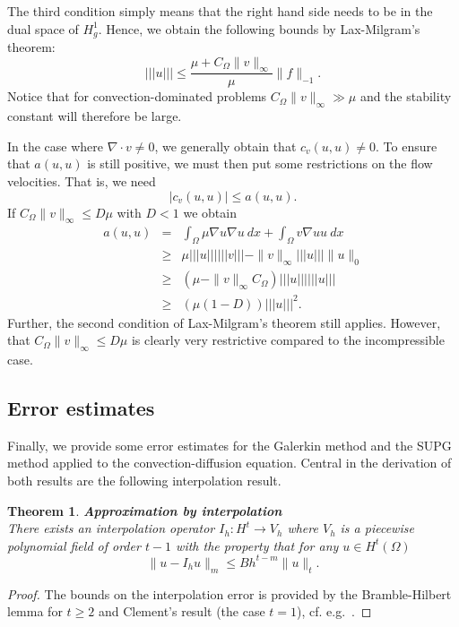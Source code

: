 \documentclass[a4paper,11pt]{amsart}
\newcommand{\norm}[1]{ |\!|\!| #1 |\!|\!|}
\newtheorem{theorem}{Theorem}[section]
\begin{document}
The third condition simply means that the right hand side needs to be in the dual 
space of $H^1_g$. Hence, we obtain the following bounds by Lax-Milgram's theorem:   
\[
\norm{u} \le \frac{ \mu + C_\Omega \|v\|_{\infty}}{\mu} \|f\|_{-1} . 
\]
Notice that for convection-dominated problems $ C_\Omega \|v\|_{\infty} \gg \mu$ 
and the stability constant will therefore be large. 

In the case where $\nabla \cdot v \not = 0$, we generally obtain that $c_v(u,u) \not = 0$. 
To ensure that $a(u,u)$ is still positive, we must then put some restrictions on 
the flow velocities. That is, we need    
\[
|c_v(u,u)| \le a(u,u) .  
\]
If $C_\Omega \|v\|_\infty \le D \mu$ with $D < 1$ we obtain   
\begin{eqnarray*}
a(u,u) &=& \int_\Omega\mu\nabla u\nabla u\ dx + \int_\Omega v\nabla uu\ dx\\
       &\ge & \mu \norm{u} \norm{v}  - \|v\|_{\infty} \norm{u} \|u\|_0 \\   
       &\ge& (\mu - \|v\|_{\infty} C_\Omega )  \norm{u} \norm{u} \\    
       &\ge& (\mu (1-D))  \norm{u}^2 .    
\end{eqnarray*}
Further, the second condition of Lax-Milgram's theorem still applies.   
However, that $C_\Omega \|v\|_\infty \le D \mu$ is clearly very restrictive 
compared to the incompressible case.   

\subsection{Error estimates}

Finally, we provide some error estimates for the
Galerkin method and the SUPG method applied to the
convection-diffusion equation. Central in the derivation
of both results are the following interpolation result.   


\begin{theorem}{\textbf{Approximation by interpolation}}\\
There exists an interpolation operator $I_h: H^t \rightarrow V_h$ 
where $V_h$ is a piecewise polynomial field of order $t-1$ with the property that   
for any $u\in H^t(\Omega)$ 
\[
\| u - I_h u \|_m \le  B h^{t-m} \|u\|_t  .  
\]
\end{theorem}
\begin{proof}
The bounds on the interpolation error is provided by 
the Bramble-Hilbert lemma for $t\ge 2$  and Clement's result (the case $t=1$), 
cf. e.g.~\cite{braess2001finite, brenner2007mathematical}.  
\end{proof}
\end{document}
